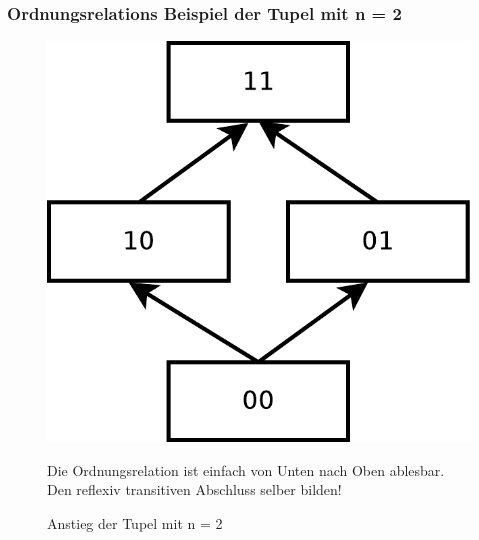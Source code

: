 \documentclass[hyperref={pdfpagelabels=false}]{beamer} %
\begin{document}
  \subsubsection*{Ordnungsrelations Beispiel der Tupel mit n = 2}
  \begin{frame}
    \begin{figure}
      \includegraphics[scale=0.30]{images/m2.pdf}
      \caption{Anstieg der Tupel mit n = 2}
      Die Ordnungsrelation ist einfach von Unten nach Oben ablesbar.\\
      Den reflexiv transitiven Abschluss selber bilden!
    \end{figure}
  \end{frame}
\end{document}
